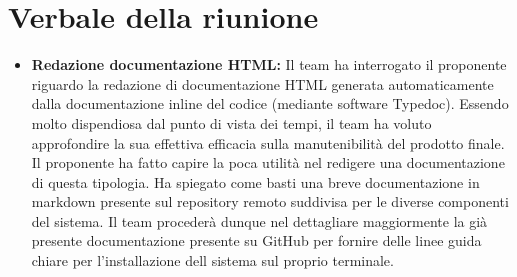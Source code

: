 \section{Verbale della riunione}
	\begin{itemize}
		\item \textbf{Redazione documentazione HTML:}
		Il team ha interrogato il proponente riguardo la redazione di documentazione HTML generata automaticamente dalla documentazione inline del codice (mediante software Typedoc). Essendo molto dispendiosa dal punto di vista dei tempi, il team ha voluto approfondire la sua effettiva efficacia sulla manutenibilità del prodotto finale. \\ Il proponente ha fatto capire la poca utilità nel redigere una documentazione di questa tipologia. Ha spiegato come basti una breve documentazione in markdown presente sul repository remoto suddivisa per le diverse componenti del sistema. Il team procederà dunque nel dettagliare maggiormente la già presente documentazione presente su GitHub per fornire delle linee guida chiare per l'installazione dell sistema sul proprio terminale.
	\end{itemize}
